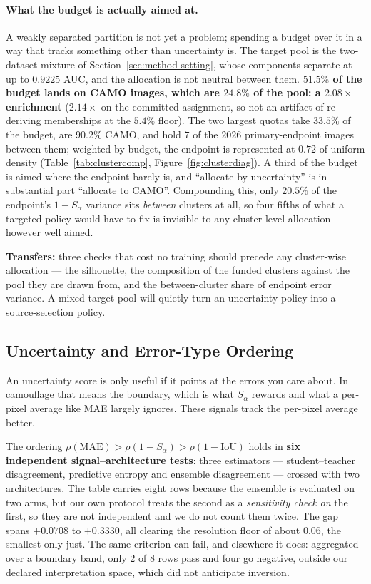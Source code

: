 \documentclass{article} %
\begin{document}
\paragraph{What the budget is actually aimed at.} A weakly separated partition is not yet a problem;
spending a budget over it in a way that tracks something other than uncertainty is. The target pool
is the two-dataset mixture of Section~\ref{sec:method-setting}, whose components separate at up to
$0.9225$ AUC, and the allocation is not neutral between them. \textbf{$51.5\%$ of the budget lands
on CAMO images, which are $24.8\%$ of the pool: a $2.08\times$ enrichment} ($2.14\times$ on the
committed assignment, so not an artifact of re-deriving memberships at the $5.4\%$ floor). The two
largest quotas take $33.5\%$ of the budget, are $90.2\%$ CAMO, and hold $7$ of the $2026$
primary-endpoint images between them; weighted by budget, the endpoint is represented at $0.72$ of
uniform density (Table~\ref{tab:clustercomp}, Figure~\ref{fig:clusterdiag}). A third of the budget
is aimed where the endpoint barely is, and ``allocate by uncertainty'' is in substantial part
``allocate to CAMO''. Compounding this, only $20.5\%$ of the endpoint's $1-S_\alpha$ variance sits
\emph{between} clusters at all, so four fifths of what a targeted policy would have to fix is
invisible to any cluster-level allocation however well aimed.

\textbf{Transfers:} three checks that cost no training should precede any cluster-wise allocation
--- the silhouette, the composition of the funded clusters against the pool they are drawn from, and
the between-cluster share of endpoint error variance. A mixed target pool will quietly turn an
uncertainty policy into a source-selection policy.

\subsection{Uncertainty and Error-Type Ordering}
\label{sec:res-ordering}

An uncertainty score is only useful if it points at the errors you care about. In camouflage that
means the boundary, which is what $S_\alpha$ rewards and what a per-pixel average like MAE largely
ignores. These signals track the per-pixel average better.

The ordering $\rho(\mathrm{MAE}) > \rho(1-S_\alpha) > \rho(1-\mathrm{IoU})$ holds in \textbf{six
independent signal--architecture tests}: three estimators --- student--teacher disagreement,
predictive entropy and ensemble disagreement --- crossed with two architectures. The table carries
eight rows because the ensemble is evaluated on two arms, but our own protocol treats the second as
a \emph{sensitivity check on} the first, so they are not independent and we do not count them twice.
The gap spans $+0.0708$ to $+0.3330$, all clearing the resolution floor of about $0.06$, the
smallest only just. The same criterion can fail, and elsewhere it does: aggregated over a boundary
band, only $2$ of $8$ rows pass and four go negative, outside our declared interpretation space,
which did not anticipate inversion.
\end{document}
